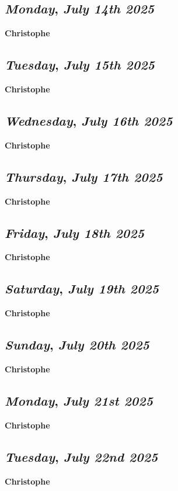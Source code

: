 \def\day{\textit{July 14th 2025}}
\def\weekday{\textit{Monday}}
\subsection*{\weekday, \day}
\textbf {Christophe}

\def\day{\textit{July 15th 2025}}
\def\weekday{\textit{Tuesday}}
\subsection*{\weekday, \day}
\textbf {Christophe}

\def\day{\textit{July 16th 2025}}
\def\weekday{\textit{Wednesday}}
\subsection*{\weekday, \day}
\textbf {Christophe}

\def\day{\textit{July 17th 2025}}
\def\weekday{\textit{Thursday}}
\subsection*{\weekday, \day}
\textbf {Christophe}

\def\day{\textit{July 18th 2025}}
\def\weekday{\textit{Friday}}
\subsection*{\weekday, \day}
\textbf {Christophe}

\def\day{\textit{July 19th 2025}}
\def\weekday{\textit{Saturday}}
\subsection*{\weekday, \day}
\textbf {Christophe}

\def\day{\textit{July 20th 2025}}
\def\weekday{\textit{Sunday}}
\subsection*{\weekday, \day}
\textbf {Christophe}

\def\day{\textit{July 21st 2025}}
\def\weekday{\textit{Monday}}
\subsection*{\weekday, \day}
\textbf {Christophe}

\def\day{\textit{July 22nd 2025}}
\def\weekday{\textit{Tuesday}}
\subsection*{\weekday, \day}
\textbf {Christophe}

